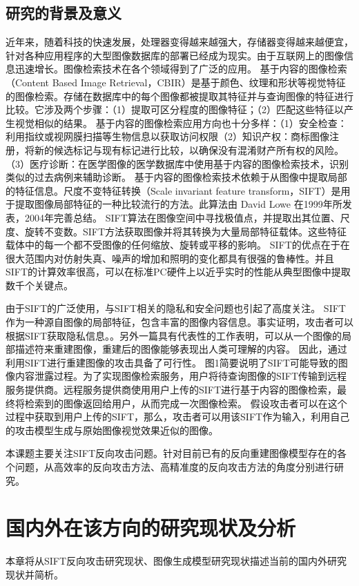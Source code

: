 \subsection{研究的背景及意义}
近年来，随着科技的快速发展，处理器变得越来越强大，存储器变得越来越便宜，针对各种应用程序的大型图像数据库的部署已经成为现实。由于互联网上的图像信息迅速增长。图像检索技术在各个领域得到了广泛的应用。
基于内容的图像检索（Content Based Image Retrieval，CBIR）\cite{2015Content}是基于颜色、纹理和形状等视觉特征的图像检索。存储在数据库中的每个图像都被提取其特征并与查询图像的特征进行比较。它涉及两个步骤：（1）提取可区分程度的图像特征；（2）匹配这些特征以产生视觉相似的结果。
基于内容的图像检索应用方向也十分多样：（1）安全检查：利用指纹或视网膜扫描等生物信息以获取访问权限（2）知识产权：商标图像注册，将新的候选标记与现有标记进行比较，以确保没有混淆财产所有权的风险。（3）医疗诊断：在医学图像的医学数据库中使用基于内容的图像检索技术，识别类似的过去病例来辅助诊断。
基于内容的图像检索技术依赖于从图像中提取局部的特征信息。尺度不变特征转换（Scale invariant feature transform，SIFT）\cite{loweDistinctiveImageFeatures2004}是用于提取图像局部特征的一种比较流行的方法。此算法由 David Lowe 在1999年所发表，2004年完善总结。
SIFT算法在图像空间中寻找极值点，并提取出其位置、尺度、旋转不变数。SIFT方法获取图像并将其转换为大量局部特征载体。这些特征载体中的每一个都不受图像的任何缩放、旋转或平移的影响。
SIFT的优点在于在很大范围内对仿射失真、噪声的增加和照明的变化都具有很强的鲁棒性。并且SIFT的计算效率很高，可以在标准PC硬件上以近乎实时的性能从典型图像中提取数千个关键点。
\par
由于SIFT的广泛使用，与SIFT相关的隐私和安全问题也引起了高度关注。\cite{9762698}\cite{Qin2014TowardsEP}
SIFT作为一种源自图像的局部特征，包含丰富的图像内容信息。\cite{10214250}事实证明，攻击者可以根据SIFT获取隐私信息。\cite{10.1145/3386082}。另外一篇具有代表性的工作\cite{5995616}表明，可以从一个图像的局部描述符来重建图像，重建后的图像能够表现出人类可理解的内容。
因此，通过利用SIFT进行重建图像的攻击具备了可行性。
图1简要说明了SIFT可能导致的图像内容泄露过程。为了实现图像检索服务，用户将待查询图像的SIFT传输到远程服务提供商。远程服务提供商使用用户上传的SIFT进行基于内容的图像检索，最终将检索到的图像返回给用户，从而完成一次图像检索。
假设攻击者可以在这个过程中获取到用户上传的SIFT，那么，攻击者可以用该SIFT作为输入，利用自己的攻击模型生成与原始图像视觉效果近似的图像。\cite{10.1145/3599589.3599596}\cite{SUN2020102642}
\par
本课题主要关注SIFT反向攻击问题。针对目前已有的反向重建图像模型存在的各个问题，从高效率的反向攻击方法、高精准度的反向攻击方法的角度分别进行研究。
\section{国内外在该方向的研究现状及分析}
本章将从SIFT反向攻击研究现状、图像生成模型研究现状描述当前的国内外研究现状并简析。
